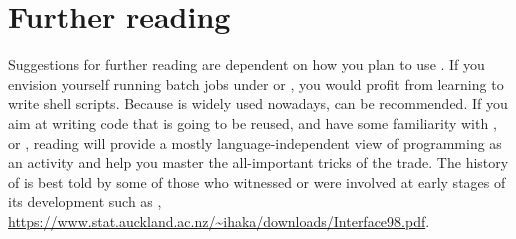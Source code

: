 \documentclass[krantz2]{krantz}\usepackage{knitr}
\begin{document}
\section{Further reading}
Suggestions for further reading are dependent on how you plan to use \Rlang. If you envision yourself running batch jobs under  or , you would profit from learning to write shell scripts. Because  is widely used nowadays,  \autocite{Newham2005} can be recommended. If you aim at writing \Rlang code that is going to be reused, and have some familiarity with \Clang, \Cpplang or \javalang, reading  \autocite{Kernighan1999} will provide a mostly language-independent view of programming as an activity and help you master the all-important tricks of the trade. The history of \Rlang is best told by some of those who witnessed or were involved at early stages of its development such as \autocite{Chambers2016}, \autocite{Ihaka1998} \url{https://www.stat.auckland.ac.nz/~ihaka/downloads/Interface98.pdf}.




















\backmatter

\printbibliography

\printindex\label{idx:general}

\printindex[rindex]\label{idx:rindex}

\printindex[rcatsidx]\label{idx:rcats}

\printindex[faqindex]\label{idx:faqindex}
\end{document}
